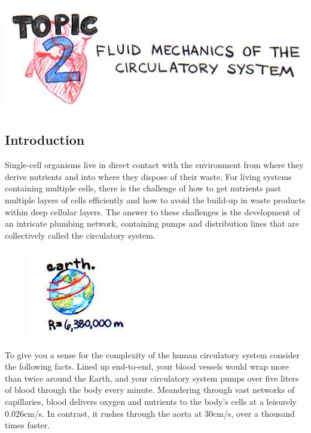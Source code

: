 \setcounter{chapter}{2}
\setcounter{section}{0}
\setcounter{figure}{0}
\setcounter{equation}{0}
\setcounter{table}{0}
\chapter*{\includegraphics[width=\textwidth]{./figures/Topic2/Topic2.jpg}}

\section{Introduction}

Single-cell organisms live in direct contact with the environment from where they derive nutrients and into where they dispose of their waste. For living systems containing multiple cells, there is the challenge of how to get nutrients past multiple layers of cells efficiently and how to avoid the build-up in waste products within deep cellular layers. The answer to these challenges is the development of an intricate plumbing network, containing pumps and distribution lines that are collectively called the circulatory system.  

\begin{figure} 
\vspace{-20pt}
  \begin{center}
    \includegraphics[width=0.4\textwidth]{./figures/Topic2/Earthclip.jpg}
  \end{center}
  \vspace{-20pt}
  \vspace{1pt}
\end{figure} 
To give you a sense for the complexity of the human circulatory system consider the following facts. Lined up end-to-end, your blood vessels would wrap more than twice around the Earth, and your circulatory system pumps over five liters of blood through the body every minute.  Meandering through vast networks of capillaries, blood delivers oxygen and nutrients to the body’s cells at a leisurely 0.026cm/s.  In contrast, it rushes through the aorta at 30cm/s, over a thousand times faster.
 
